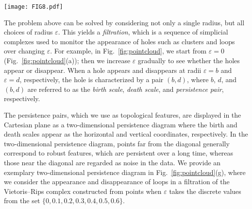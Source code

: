\documentclass[twocolumn,pre,amsmath,amssymb]{revtex4-1}
\begin{document}
\begin{figure*}[t]
	\texttt{[image: FIG8.pdf]}
	\protect\caption{We consider $L$-dimensional hyperspheres with radius $\varepsilon$ centered at each point. From (a) to (f), we increase the radius $\varepsilon$ gradually. By increasing $\varepsilon$, holes appear and disappear in the region. The first one-dimensional hole (blue loop) appears at (c), while the second (red loop) appears at (d). Then at (e), the first hole disappears and finally the second one disappears at (f).
	(g) An examplary two-dimensional persistence diagram calculated by considering the appearance and disappearance of loops from a filtration of the Vietoris--Rips complex. The radius $\varepsilon$ takes the discrete values from the set \{0, 0.1, 0.2, 0.3, 0.4, 0.5, 0.6\}. There are two persistence pairs (0.2, 0.4) and (0.3, 0.6), which represent the appearance and disappearance of the blue loop and the red loop, respectively. 
	These persistence pairs are displayed as a blue circle and a red triangle in the Cartesian plane, respectively. The collection of all the persistence pairs in the filtration is a two-dimensional persistence diagram.
	\label{fig:pointcloud}}
\end{figure*}

	The problem above can be solved by considering not only a single radius, but all choices of radius $\varepsilon$.
    This yields a \emph{filtration}, 
    which is a sequence of simplicial complexes used to monitor the appearance of holes such as clusters and loops over changing $\varepsilon$. For example, in Fig.~\ref{fig:pointcloud}, we start from $\varepsilon=0$ (Fig.~\ref{fig:pointcloud}(a)); then we increase $\varepsilon$ gradually to see whether the holes appear or disappear. 
    When a hole appears and disappears at radii $\varepsilon=b$ and $\varepsilon=d$, respectively, the hole is characterized by a pair $(b, d)$, where $b$, $d$, and $(b, d)$ are referred to as the \textit{birth scale}, \textit{death scale}, and \textit{persistence pair}, respectively. 
    
    The persistence pairs, which we use as topological features, 
    are displayed in the Cartesian plane as a two-dimensional persistence diagram where the birth and death scales appear as the horizontal and vertical coordinates, respectively. In the two-dimensional persistence diagram, points far from the diagonal generally correspond to robust features, which are persistent over a long time, whereas those near the diagonal are regarded as noise in the data. We provide an exemplary two-dimensional persistence diagram in Fig.~\ref{fig:pointcloud}(g), where we consider the appearance and disappearance of loops in a filtration of the Vietoris--Rips complex constructed from points when $\varepsilon$ takes the discrete values from the set $\{0, 0.1, 0.2, 0.3, 0.4, 0.5, 0.6 \}$.
\end{document}
